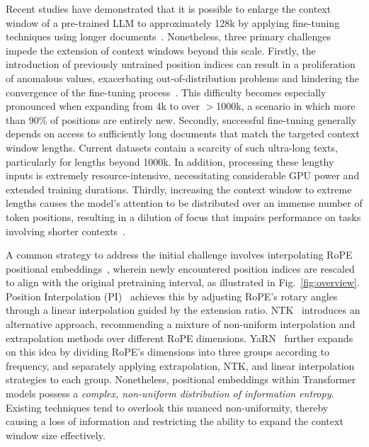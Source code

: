 Recent studies have demonstrated that it is possible to enlarge the context window of a pre-trained LLM to approximately 128k by applying fine-tuning techniques using longer documents~\cite{longlora,pi,yarn,zhang2024soaring,liu2023scaling}. Nonetheless, three primary challenges impede the extension of context windows beyond this scale. Firstly, the introduction of previously untrained position indices can result in a proliferation of anomalous values, exacerbating out-of-distribution problems and hindering the convergence of the fine-tuning process~\cite{pi}. This difficulty becomes especially pronounced when expanding from 4k to over $>$1000k, a scenario in which more than 90\% of positions are entirely new. Secondly, successful fine-tuning generally depends on access to sufficiently long documents that match the targeted context window lengths. Current datasets contain a scarcity of such ultra-long texts, particularly for lengths beyond 1000k. In addition, processing these lengthy inputs is extremely resource-intensive, necessitating considerable GPU power and extended training durations. Thirdly, increasing the context window to extreme lengths causes the model’s attention to be distributed over an immense number of token positions, resulting in a dilution of focus that impairs performance on tasks involving shorter contexts~\cite{pi}.

A common strategy to address the initial challenge involves interpolating RoPE positional embeddings~\cite{rope,pi}, wherein newly encountered position indices are rescaled to align with the original pretraining interval, as illustrated in Fig.~\ref{fig:overview}. Position Interpolation (PI)~\cite{pi} achieves this by adjusting RoPE’s rotary angles through a linear interpolation guided by the extension ratio. NTK~\cite{ntk,dynamicntk} introduces an alternative approach, recommending a mixture of non-uniform interpolation and extrapolation methods over different RoPE dimensions. YaRN~\cite{yarn} further expands on this idea by dividing RoPE’s dimensions into three groups according to frequency, and separately applying extrapolation, NTK, and linear interpolation strategies to each group. Nonetheless, positional embeddings within Transformer models possess a \emph{complex, non-uniform distribution of information entropy}. Existing techniques tend to overlook this nuanced non-uniformity, thereby causing a loss of information and restricting the ability to expand the context window size effectively.

